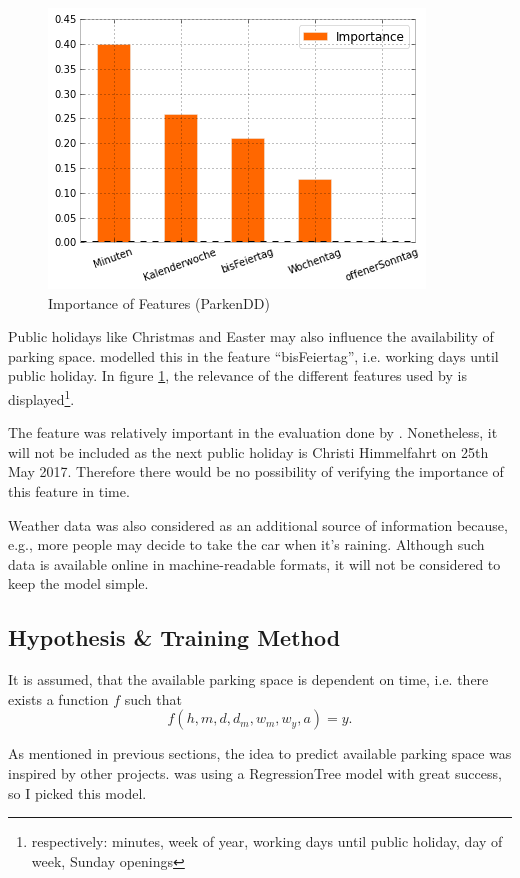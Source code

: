 \documentclass[journal,10pt]{IEEEtran}
\newcommand{\hod}{h}
\newcommand{\moh}{m}
\newcommand{\dow}{d}
\newcommand{\dom}{d_m}
\newcommand{\wom}{w_m}
\newcommand{\woy}{w_y}
\newcommand{\yyy}{a}
\begin{document}
\begin{figure}
  \centering
  \includegraphics[scale=0.5]{parkendd-Feature-Importance.png}
  \caption{Importance of Features (ParkenDD)}
  \label{fig:parkendd_features}
\end{figure}

Public holidays like Christmas and Easter may also influence the availability of parking space. \cite{parkendd} modelled this in the feature ``bisFeiertag'', i.e. working days until public holiday. In figure \ref{fig:parkendd_features}, the relevance of the different features used by \cite{parkendd} is displayed\footnote{respectively: minutes, week of year, working days until public holiday, day of week, Sunday openings}. 

The feature was relatively important in the evaluation done by \cite{parkendd}. Nonetheless, it will not be included as the next public holiday is Christi Himmelfahrt on 25th May 2017. Therefore there would be no possibility of verifying the importance of this feature in time.

Weather data was also considered as an additional source of information because, e.g., more people may decide to take the car when it's raining. Although such data is available online in machine-readable formats, it will not be considered to keep the model simple.

\subsection{Hypothesis \& Training Method}

It is assumed, that the available parking space is dependent on time, i.e. there exists a function \(f\) such that 
\[
f(\hod, \moh, \dow, \dom, \wom, \woy, \yyy) = y\text{.}
\]

As mentioned in previous sections, the idea to predict available parking space was inspired by other projects. \cite{parkendd} was using a RegressionTree model with great success, so I picked this model.
\end{document}
